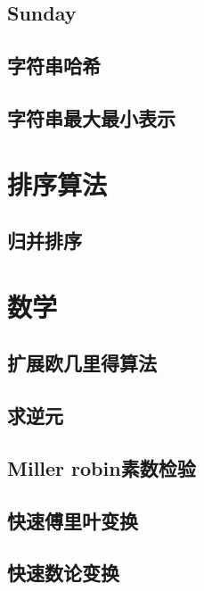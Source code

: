 \documentclass{ctexart}
\begin{document}
\subsection{Sunday}

\subsection{字符串哈希}

\subsection{字符串最大最小表示}




\section{排序算法}
\subsection{归并排序}




\section{数学}
\subsection{扩展欧几里得算法}

\subsection{求逆元}

\subsection{Miller robin素数检验}

\subsection{快速傅里叶变换}

\subsection{快速数论变换}

\end{document}
